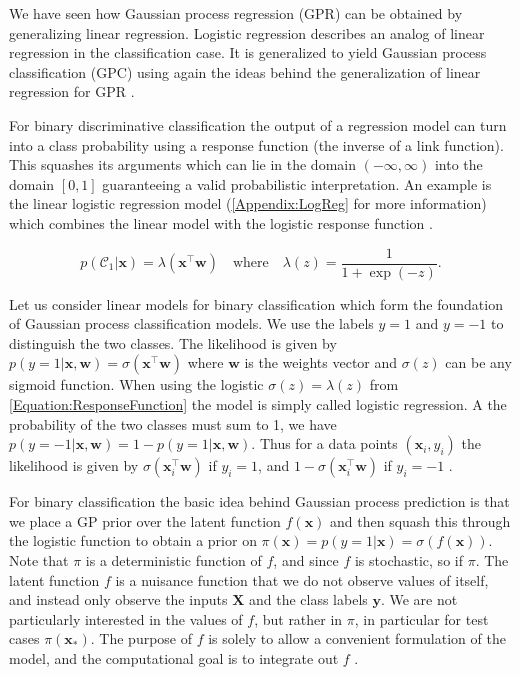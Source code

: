 \documentclass[../../../main.tex]{subfiles}
\begin{document}
We have seen how Gaussian process regression (GPR) can be obtained by generalizing linear regression. Logistic regression describes an analog of linear regression in the classification case. It is generalized to yield Gaussian process classification (GPC) using again the ideas behind the generalization of linear regression for GPR \autocite{Rasmussen2005}.

For binary discriminative classification the output of a regression model can turn into a class probability using a response function (the inverse of a link function). This squashes its arguments which can lie in the domain $(-\infty,\infty)$ into the domain $[0,1]$ guaranteeing a valid probabilistic interpretation. An example is the linear logistic regression model (\autoref{Appendix:LogReg} for more information) which combines the linear model with the logistic response function \autocite{Rasmussen2005}.

\begin{equation}
p(\mathcal{C}_1|\bm{x})=\lambda(\bm{x}^\top\bm{w}) \quad \text{where} \quad \lambda(z)=\frac{1}{1+\exp(-z)}.
\label{Equation:ResponseFunction}
\end{equation}

Let us consider linear models for binary classification which form the foundation of Gaussian process classification models. We use the labels $y=1$ and $y=-1$ to distinguish the two classes. The likelihood is given by $p(y=1|\bm{x},\bm{w}) = \sigma(\bm{x}^\top\bm{w})$ where $\bm{w}$ is the weights vector and $\sigma(z)$ can be any sigmoid function. When using the logistic $\sigma(z)=\lambda(z)$ from \autoref{Equation:ResponseFunction} the model is simply called logistic regression. A the probability of the two classes must sum to 1, we have $p(y=-1|\bm{x},\bm{w})=1-p(y=1|\bm{x},\bm{w})$. Thus for a data points $(\bm{x}_i,y_i)$ the likelihood is given by $\sigma(\bm{x}_i^\top\bm{w})$ if $y_i=1$, and $1-\sigma(\bm{x}_i^\top\bm{w})$ if $y_i=-1$ \autocite{Rasmussen2005}.

For binary classification the basic idea behind Gaussian process prediction is that we place a GP prior over the latent function $f(\bm{x})$ and then squash this through the logistic function to obtain a prior on $\pi(\bm{x})=p(y=1|\bm{x})=\sigma(f(\bm{x}))$. Note that $\pi$ is a deterministic function of $f$, and since $f$ is stochastic, so if $\pi$. The latent function $f$ is a nuisance function that we do not observe values of itself, and instead only observe the inputs $\bm{X}$ and the class labels $\bm{y}$. We are not particularly interested in the values of $f$, but rather in $\pi$, in particular for test cases $\pi(\bm{x}_\ast)$. The purpose of $f$ is solely to allow a convenient formulation of the model, and the computational goal is to integrate out $f$ \autocite{Rasmussen2005}.
\end{document}
